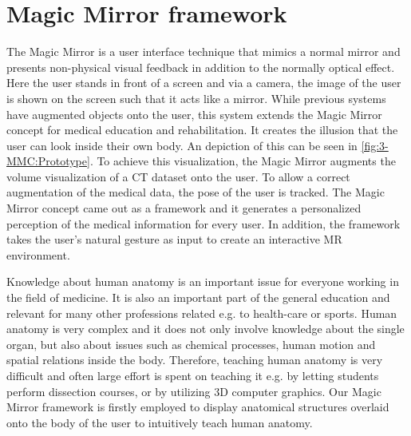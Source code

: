 \section{Magic Mirror framework} \label{sec:3-PPMM:MMC}
The Magic Mirror \cite{Grosjean1999} is a user interface technique that mimics a normal mirror and presents non-physical visual feedback in addition to the normally optical effect. Here the user stands in front of a screen and via a camera, the image of the user is shown on the screen such that it acts like a mirror. 
While previous systems have augmented objects onto the user, this system extends the Magic Mirror concept for medical education and rehabilitation. It creates the illusion that the user can look inside their own body. An depiction of this can be seen in \figurename{\ref{fig:3-MMC:Prototype}}. To achieve this visualization, the Magic Mirror augments the volume visualization of a CT dataset onto the user. 
To allow a correct augmentation of the medical data, the pose of the user is tracked. The Magic Mirror concept came out as a framework and it generates a personalized perception of the medical information for every user. In addition, the framework takes the user's natural gesture as input to create an interactive MR environment. 

Knowledge about human anatomy is an important issue for everyone working in the field of medicine. 
It is also an important part of the general education and relevant for many other professions related e.g. to health-care or sports. Human anatomy is very complex and it does not only involve knowledge about the single organ, but also about issues such as chemical processes, human motion and spatial relations inside the body. Therefore, teaching human anatomy is very difficult and often large effort is spent on teaching it e.g. by letting students perform dissection courses, or by utilizing 3D computer graphics.
Our Magic Mirror framework is firstly employed to display anatomical structures overlaid onto the body of the user to intuitively teach human anatomy. 

